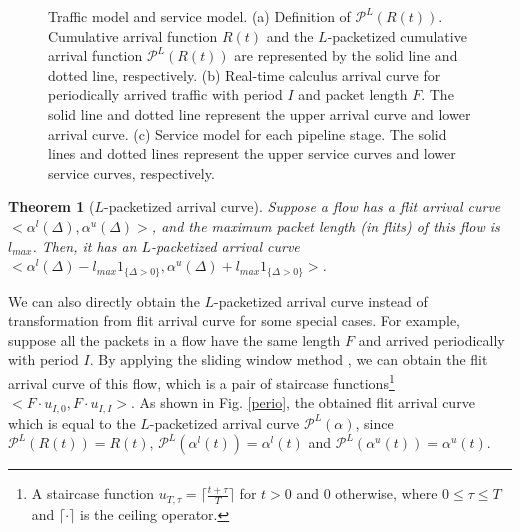 \documentclass[preprint]{elsarticle}
\newtheorem{thm}{Theorem}
\def\QED{\mbox{\rule[0pt]{1.3ex}{1.3ex}}}
\begin{document}
\begin{figure}
  \caption{Traffic model and service model. (a) Definition of $\mathcal{P}^L(R(t))$. Cumulative arrival function $R(t)$ and the $L$-packetized cumulative arrival function $\mathcal{P}^L(R(t))$ are represented by the solid line and dotted line, respectively. (b) Real-time calculus arrival curve for periodically arrived traffic with period $I$ and packet length $F$. The solid line and dotted line represent the upper arrival curve and lower arrival curve. (c) Service model for each pipeline stage. The solid lines and dotted lines represent the upper service curves and lower service curves, respectively.}\label{ac}
\end{figure}
\begin{thm}[$L$-packetized arrival curve]\label{pktac}
Suppose a flow has a flit arrival curve $<\alpha^l(\Delta),\alpha^u(\Delta)>$, and the maximum packet length (in flits) of this flow is $l_{max}$. Then, it has an $L$-packetized arrival curve $<\alpha^l(\Delta)-l_{max}1_{\{\Delta>0\}},\alpha^u(\Delta)+l_{max}1_{\{\Delta>0\}}>$.
\end{thm}

We can also directly obtain the $L$-packetized arrival curve instead of transformation from flit arrival curve for some special cases. For example, suppose all the packets in a flow have the same length $F$ and arrived periodically with period $I$. By applying the sliding window method \cite{1253607}, we can obtain the flit arrival curve of this flow, which is a pair of staircase functions\footnote{A staircase function $u_{T,\tau}=\lceil\frac{t+\tau}{T}\rceil$ for $t>0$ and 0 otherwise, where $0\leq \tau\leq T$ and $\lceil\cdot\rceil$ is the ceiling operator.} $<F\cdot u_{I,0},F\cdot u_{I,I}>$. As shown in Fig. \ref{perio}, the obtained flit arrival curve which is equal to the $L$-packetized arrival curve $\mathcal{P}^L(\alpha)$, since $\mathcal{P}^L(R(t))=R(t)$, $\mathcal{P}^L(\alpha^l(t))=\alpha^l(t)$ and $\mathcal{P}^L(\alpha^u(t))=\alpha^u(t)$.
\end{document}

